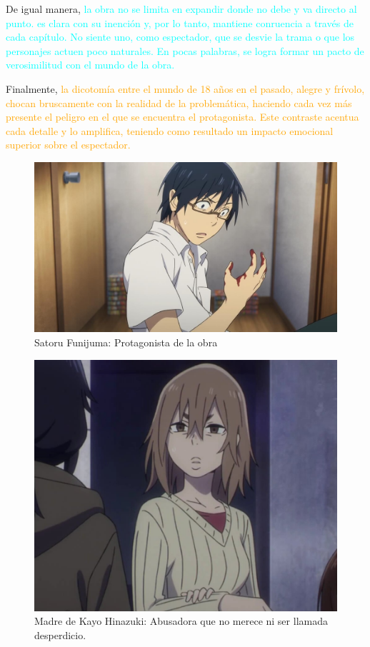 \documentclass[A5paper, 11pt]{article}
\begin{document}
De igual manera, \textcolor{cyan}{la obra no se limita en expandir donde no debe y va directo al punto. es clara con su inenci\'on y, por lo tanto, mantiene conruencia a trav\'es de cada cap\'itulo. No siente uno, como espectador, que se desvie la trama o que los personajes actuen poco naturales. En pocas palabras, se logra formar un pacto de verosimilitud con el mundo de la obra.}

Finalmente, \textcolor{orange}{la dicotom\'ia entre el mundo de 18 a\~nos en el pasado, alegre y fr\'ivolo, chocan bruscamente con la realidad de la problem\'atica, haciendo cada vez m\'as presente el peligro en el que se encuentra el protagonista. Este contraste acentua cada detalle y lo amplifica, teniendo como resultado un impacto emocional superior sobre el espectador.}

\begin{figure}[h]
        \centering
        \includegraphics[scale=0.2, angle=-18]{Satoru funijuma.jpg}
        \caption*{Satoru Funijuma: Protagonista de la obra}
    \end{figure}
\begin{figure}[h]
        \centering
        \includegraphics[scale=0.2, angle=8]{Hündin (1).jpg}
        \caption*{Madre de Kayo Hinazuki: Abusadora que no merece ni ser llamada desperdicio.}
    \end{figure}
        
\end{document}
